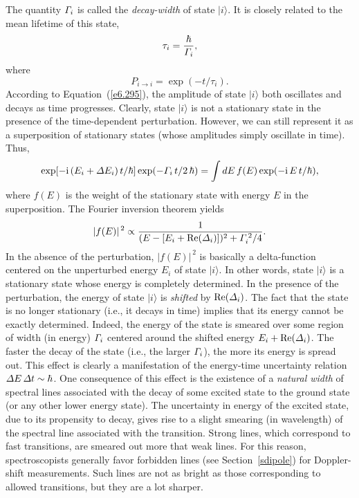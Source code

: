 The quantity ${\mit\Gamma}_i$ is called the {\em decay-width}\/ of state $|i\rangle$.
 It is
closely related to the mean lifetime of this state,
\begin{equation}
\tau_i =\frac{\hbar}{{\mit\Gamma}_i},
\end{equation}
where 
\begin{equation}
P_{i\rightarrow i} = \exp(- t/\tau_i).
\end{equation}
According to Equation~(\ref{e6.295}), the amplitude of state $|i\rangle$ both oscillates
and decays as time progresses. Clearly, state $|i\rangle$ is not a
stationary state in the presence of the time-dependent perturbation. 
However, we can still represent it as a superposition of stationary
states (whose amplitudes simply oscillate in time). Thus,
\begin{equation}
\exp[-{\rm i}\,(E_i + {\mit\Delta} E_i)\,t/\hbar]
\exp( - {\mit\Gamma}_i\,t/2\,\hbar)  = \int dE\,f(E) \exp(-{\rm i}\, E\,t/\hbar),
\end{equation}
where $f(E)$ is the weight of the  stationary state with energy $E$ in the
superposition. The Fourier inversion theorem yields
\begin{equation}
|f(E)|^{\,2} \propto \frac{1}{(E - [E_i +{\rm Re}({\mit\Delta}_i)])^2 + {\mit\Gamma}_i^{\,2}/4}.
\end{equation}
In the absence of the perturbation, $|f(E)|^{\,2}$ is basically a delta-function
centered on the unperturbed energy $E_i$ of state $|i\rangle$. 
In other words, state $|i\rangle$ is a stationary state whose energy is
completely determined. In the presence of the perturbation, the energy
of state $|i\rangle$ is {\em shifted}\/ by ${\rm Re}({\mit\Delta}_i)$. The fact that
the state is no longer stationary ({\rm i.e.}, it decays in time) implies that
its energy cannot be exactly determined. Indeed, the 
energy of the state
is smeared over some region of width (in energy) ${\mit\Gamma}_i$ centered
around the shifted energy $E_i +{\rm Re}({\mit\Delta}_i)$. The faster the
decay of the state ({\rm i.e.}, the larger ${\mit\Gamma}_i$), the more its
energy is spread out. This effect is clearly a manifestation of
the energy-time uncertainty relation ${\mit\Delta} E\, {\mit\Delta} t \sim \hbar$. 
One consequence of this effect is the existence of a {\em natural
width}\/ of spectral lines associated with the decay of some excited
state to the ground state (or any other lower energy state). The uncertainty
in energy of the excited state, due to its propensity to decay, gives
rise to a slight smearing (in wavelength)
of the spectral line associated with the
transition. Strong lines, which correspond to fast transitions, are smeared out
more that weak lines. For this reason, spectroscopists generally favor
forbidden lines (see Section~\ref{sdipole}) for Doppler-shift measurements. Such lines are not as bright
as those corresponding to allowed transitions, but they are a lot sharper. 

